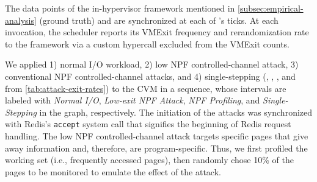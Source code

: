 
The data points of the in-hypervisor framework mentioned in \cref{subsec:empirical-analysis} (ground truth) and \thename are synchronized at each of \thename's ticks.
At each invocation, the scheduler reports its VMExit frequency and rerandomization rate to the framework via a custom hypercall excluded from the VMExit counts.


We applied 1) normal I/O workload, 2) low NPF controlled-channel attack, 3) conventional NPF controlled-channel attacks, and 4) single-stepping (\lredis, \llenpf, \lnpf, and \lss from \autoref{tab:attack-exit-rates}) to the CVM in a sequence, whose intervals are labeled with \emph{Normal I/O}, \emph{Low-exit NPF Attack}, \emph{NPF Profiling}, and \emph{Single-Stepping} in the graph, respectively.
The initiation of the attacks was synchronized with Redis's \texttt{accept} system call that signifies the beginning of Redis request handling.
The low NPF controlled-channel attack targets specific pages that give away information and, therefore, are program-specific.
Thus, we first profiled the working set (i.e., frequently accessed pages), then randomly chose 10\% of the pages to be monitored to emulate the effect of the attack.



